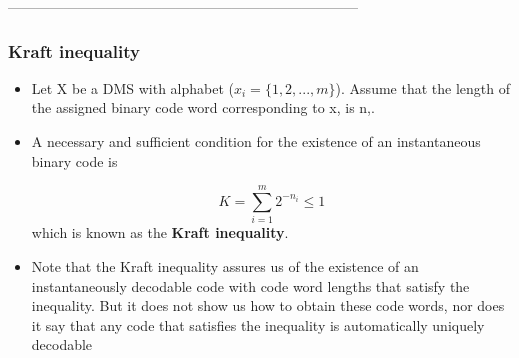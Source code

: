 \documentclass[a4]{beamer}
\begin{document}
---------------------------------------------------------------------------%
\begin{frame}
\frametitle{ Kraft inequality}
\begin{itemize}
\item Let X be a DMS with alphabet ($x _i = \{1, 2, . . . ,m\}$). Assume that the length of the assigned binary
code word corresponding to x, is n,.
\item A necessary and sufficient condition for the existence of an instantaneous binary code is
 
 \[ K = \sum^{m}_{i=1}2^{-n_i} \leq 1 \]
which is known as the \textbf{Kraft inequality}.
\item Note that the Kraft inequality assures us of the existence of an instantaneously decodable code
with code word lengths that satisfy the inequality. But it does not show us how to obtain these code
words, nor does it say that any code that satisfies the inequality is automatically uniquely decodable
\end{itemize}
\end{frame}
\end{document}
